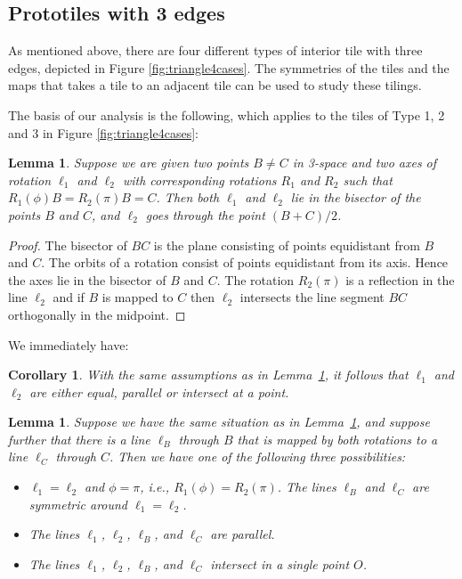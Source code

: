 \documentclass[11pt]{amsart}
\newtheorem{corollary}[theorem]{Corollary}
\newtheorem{lemma}[theorem]{Lemma}
\theoremstyle{remark}
\newcounter{case}
\begin{document}
\subsection{Prototiles with 3 edges} \label{sec:3edge}
As mentioned above, there are four different types of interior tile with three edges, depicted in
Figure \ref{fig:triangle4cases}.   The symmetries of the tiles and the maps that takes a tile to an adjacent 
tile can be used to study these tilings.



The basis of our analysis is the following, which applies to the tiles of Type 1, 2 and 3 in 
Figure  \ref{fig:triangle4cases}:
\begin{lemma}
  \label{thm:axis_in_bisector}
  Suppose we are given two points $B\neq C$ in 3-space and two axes of
  rotation $\ell_1$ and $\ell_2$ with corresponding rotations $R_1$
  and $R_2$ such that $R_1(\phi)B=R_2(\pi)B=C$. Then both $\ell_1$
  and $\ell_2$ lie in the bisector of the points $B$ and $C$, and
  $\ell_2$ goes through the point $(B+C)/2$.
\end{lemma}
\begin{proof}
The bisector of $BC$ is the plane consisting of points equidistant from $B$ and $C$. The orbits of a rotation consist of points equidistant from its axis. Hence the axes lie in the bisector of $B$ and $C$.
  The rotation $R_2(\pi)$ is a reflection in the line $\ell_2$ and if
  $B$ is mapped to $C$ then $\ell_2$ intersects the line segment $BC$
  orthogonally in the midpoint. 
\end{proof}
We immediately have:
\begin{corollary} \label{casescor}
  With the same assumptions as in Lemma~\ref{thm:axis_in_bisector}, it follows that
  $\ell_1$ and $\ell_2$ are either equal, parallel or intersect at a
  point.
\end{corollary}
\begin{lemma}
  \label{thm:two_rotations}
 Suppose we have the same situation as in
  Lemma~\ref{thm:axis_in_bisector}, and suppose further that 
  there is a line
  $\ell_B$ through $B$ that is mapped by both rotations to a line $\ell_C$ through $C$.
  Then we have one of the
  following three possibilities:
  \begin{itemize}
  \item  $\ell_1=\ell_2$ and $\phi=\pi$, i.e.,
    $R_1(\phi)=R_2(\pi)$. The lines $\ell_B$ and $\ell_C$ are
    symmetric around $\ell_1=\ell_2$.
  \item The lines $\ell_1$, $\ell_2$, $\ell_B$, and $\ell_C$ are
    parallel.
  \item The lines $\ell_1$, $\ell_2$, $\ell_B$, and $\ell_C$ intersect
    in a single point $O$.
  \end{itemize}
\end{lemma}
\end{document}
